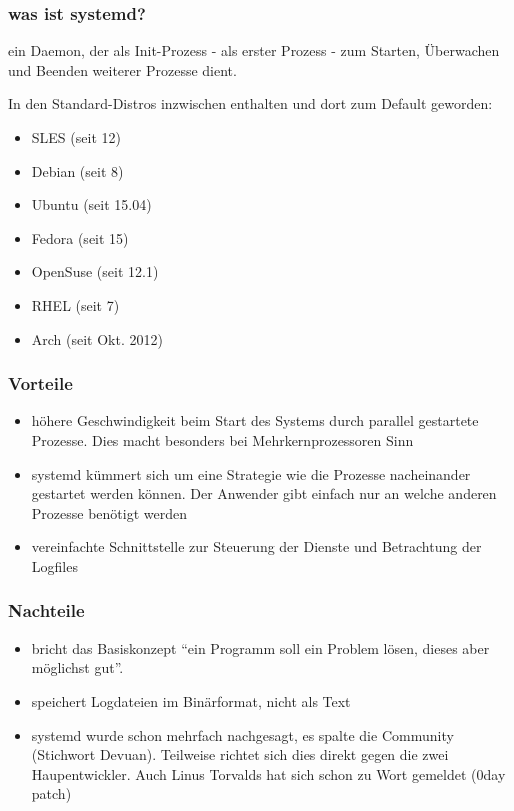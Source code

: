 
\begin{frame}
\frametitle{was ist systemd?}
ein Daemon, der als Init-Prozess - als erster Prozess - zum Starten, Überwachen
und Beenden weiterer Prozesse dient.

In den Standard-Distros inzwischen enthalten und dort zum Default geworden:

\begin{itemize}
  \item SLES (seit 12)
  \item Debian (seit 8)
  \item Ubuntu (seit 15.04)
  \item Fedora (seit 15)
  \item OpenSuse (seit 12.1)
  \item RHEL (seit 7)
  \item Arch (seit Okt. 2012)
\end{itemize}

\end{frame}

\begin{frame}
  \frametitle{Vorteile}
  \begin{itemize}
    \item höhere Geschwindigkeit beim Start des Systems durch parallel gestartete
          Prozesse. Dies macht besonders bei Mehrkernprozessoren Sinn
    \item systemd kümmert sich um eine Strategie wie die Prozesse nacheinander
          gestartet werden können. Der Anwender gibt einfach nur an welche anderen Prozesse benötigt werden
    \item vereinfachte Schnittstelle zur Steuerung der Dienste und Betrachtung der Logfiles
  \end{itemize}
\end{frame}

\begin{frame}
  \frametitle{Nachteile}
  \begin{itemize}
    \item bricht das Basiskonzept "`ein Programm soll ein Problem lösen, dieses aber möglichst gut"'.
    \item speichert Logdateien im Binärformat, nicht als Text
    \item systemd wurde schon mehrfach nachgesagt, es spalte die Community (Stichwort Devuan). Teilweise richtet
  sich dies direkt gegen die zwei Haupentwickler. Auch Linus Torvalds hat sich schon zu Wort gemeldet (0day patch)
  \end{itemize}

\end{frame}

